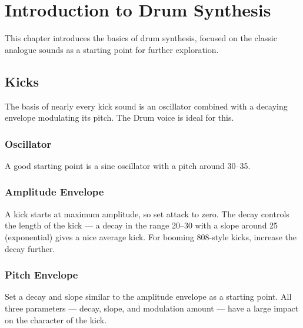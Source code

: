 \section{Introduction to Drum
Synthesis}\label{introduction-to-drum-synthesis}


This chapter introduces the basics of drum synthesis, focused on the
classic analogue sounds as a starting point for further exploration.

\subsection{Kicks}\label{kicks}

The basis of nearly every kick sound is an oscillator combined with a
decaying envelope modulating its pitch. The Drum voice is ideal for
this.

\subsubsection{Oscillator}\label{oscillator}

A good starting point is a sine oscillator with a pitch around 30--35.

\subsubsection{Amplitude Envelope}\label{amplitude-envelope}

A kick starts at maximum amplitude, so set attack to zero. The decay
controls the length of the kick --- a decay in the range 20--30 with a
slope around 25 (exponential) gives a nice average kick. For booming
808-style kicks, increase the decay further.

\subsubsection{Pitch Envelope}\label{pitch-envelope}

Set a decay and slope similar to the amplitude envelope as a starting
point. All three parameters --- decay, slope, and modulation amount ---
have a large impact on the character of the kick.

